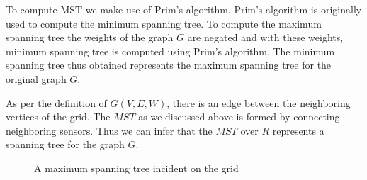 To compute MST we make use of Prim's algorithm\cite{BLTJ:BLTJ1515}.  Prim's algorithm is originally used to compute the minimum spanning tree. To compute the maximum spanning tree the weights of the graph $G$ are negated and with these weights, minimum spanning tree is computed using Prim's algorithm. The minimum spanning tree thus obtained represents the maximum spanning tree for the original graph $G$.

As per the definition of $G(V,E,W)$, there is an edge between the neighboring vertices of the grid. The $MST$ as we discussed above is formed by connecting neighboring sensors. Thus we can infer that the $MST$ over $R$ represents a spanning tree for the graph $G$. 

\begin{figure}[!ht]
\qquad \qquad \qquad
{}
\caption{A maximum spanning tree incident on the grid}
\label{fig:MST}
\end{figure}




